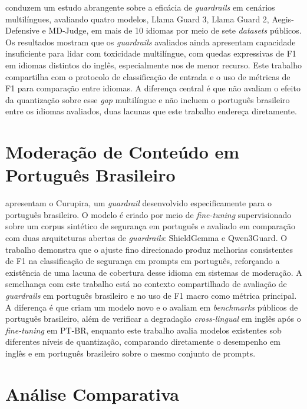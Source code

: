  conduzem um estudo abrangente sobre a eficácia de \textit{guardrails} em cenários multilíngues, avaliando quatro modelos, Llama Guard 3, Llama Guard 2, Aegis-Defensive e MD-Judge, em mais de 10 idiomas por meio de sete \textit{datasets} públicos. Os resultados mostram que os \textit{guardrails} avaliados ainda apresentam capacidade insuficiente para lidar com toxicidade multilíngue, com quedas expressivas de F1 em idiomas distintos do inglês, especialmente nos de menor recurso. Este trabalho compartilha com  o protocolo de classificação de entrada e o uso de métricas de F1 para comparação entre idiomas. A diferença central é que  não avaliam o efeito da quantização sobre esse \textit{gap} multilíngue e não incluem o português brasileiro entre os idiomas avaliados, duas lacunas que este trabalho endereça diretamente.


\section{Moderação de Conteúdo em Português Brasileiro}
\label{sec:curupira}

 apresentam o Curupira, um \textit{guardrail} desenvolvido especificamente para o português brasileiro. O modelo é criado por meio de \textit{fine-tuning} supervisionado sobre um corpus sintético de segurança em português e avaliado em comparação com duas arquiteturas abertas de \textit{guardrails}: ShieldGemma e Qwen3Guard. O trabalho demonstra que o ajuste fino direcionado produz melhorias consistentes de F1 na classificação de segurança em prompts em português, reforçando a existência de uma lacuna de cobertura desse idioma em sistemas de moderação. A semelhança com este trabalho está no contexto compartilhado de avaliação de \textit{guardrails} em português brasileiro e no uso de F1 macro como métrica principal. A diferença é que  criam um modelo novo e o avaliam em \textit{benchmarks} públicos de português brasileiro, além de verificar a degradação \textit{cross-lingual} em inglês após o \textit{fine-tuning} em PT-BR, enquanto este trabalho avalia modelos existentes sob diferentes níveis de quantização, comparando diretamente o desempenho em inglês e em português brasileiro sobre o mesmo conjunto de prompts.


\section{Análise Comparativa}
\label{sec:analise-comparativa}

